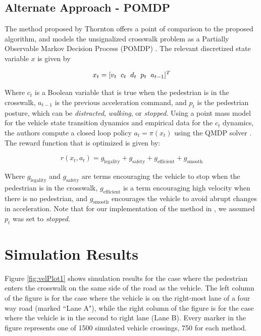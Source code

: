 \documentclass[letterpaper, 10 pt, conference]{ieeeconf}  %
\begin{document}
\subsection{Alternate Approach - POMDP}
The method proposed by Thornton \cite{Thornton2018} offers a point of comparison to the proposed algorithm, and models the unsignalized crosswalk problem as a Partially 
Observable Markov Decision Process (POMDP) \cite{Kochenderfer2015}. The relevant discretized state variable $x$ is given by

\begin{equation}
x_t = [v_t \hspace{2mm} c_t \hspace{2mm} d_t \hspace{2mm} p_t \hspace{2mm} a_{t-1}]^T
\end{equation}

Where $c_t$ is a Boolean variable that is true when the pedestrian is in the crosswalk, $a_{t-1}$ is the previous acceleration command, and $p_t$ is the pedestrian posture, which can be \textit{distracted}, \textit{walking}, or \textit{stopped}. Using a point mass model for the vehicle state transition dynamics and empirical data for the $c_t$ dynamics, the authors compute a closed loop policy $a_t = \pi(x_t)$ using the QMDP solver \cite{Kochenderfer2015}. The reward function that is optimized is given by: 

\begin{equation}
r(x_t, a_t) = g_\mathrm{legality} + g_\mathrm{safety} + g_\mathrm{efficient} + g_\mathrm{smooth}
\end{equation}

Where $g_\mathrm{legality}$ and $g_\mathrm{safety}$ are terms encouraging the vehicle to stop when the pedestrian is in the crosswalk, $g_\mathrm{efficient}$ is a term encouraging high velocity when there is no pedestrian, and $g_\mathrm{smooth}$ encourages the vehicle to avoid abrupt changes in acceleration. Note that for our implementation of the method in \cite{Thornton2018}, we assumed $p_t$ was set to \textit{stopped}.  

\section{Simulation Results}

Figure \ref{fig:velPlot1} shows simulation results for the case where the pedestrian enters the crosswalk on the same side of the road as the vehicle. The left column of the figure is for the case where the vehicle is on the right-most lane of a four way road (marked ``Lane A"), while the right column of the figure is for the case where the vehicle is in the second to right lane (Lane B). Every marker in the figure represents one of 1500 simulated vehicle crossings, 750 for each method.
\end{document}
